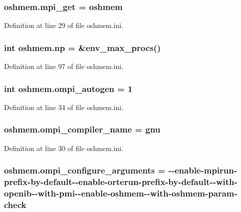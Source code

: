 \hypertarget{namespaceoshmem_a4426807cb10649f44b732f4360d67069}{
\subsubsection[{mpi\-\_\-get}]{\setlength{\rightskip}{0pt plus 5cm}oshmem.\-mpi\-\_\-get = oshmem}}\label{namespaceoshmem_a4426807cb10649f44b732f4360d67069}


Definition at line 29 of file oshmem.\-ini.

\hypertarget{namespaceoshmem_a26fdec706a8cb58b216928c30a41db44}{
\subsubsection[{np}]{\setlength{\rightskip}{0pt plus 5cm}int oshmem.\-np = \&env\-\_\-max\-\_\-procs()}}\label{namespaceoshmem_a26fdec706a8cb58b216928c30a41db44}


Definition at line 97 of file oshmem.\-ini.

\hypertarget{namespaceoshmem_a44a772104c935ce09c4ddfd8a449cad3}{
\subsubsection[{ompi\-\_\-autogen}]{\setlength{\rightskip}{0pt plus 5cm}int oshmem.\-ompi\-\_\-autogen = 1}}\label{namespaceoshmem_a44a772104c935ce09c4ddfd8a449cad3}


Definition at line 34 of file oshmem.\-ini.

\hypertarget{namespaceoshmem_a1ba136fa8004e20e4cebfc4fc401869f}{
\subsubsection[{ompi\-\_\-compiler\-\_\-name}]{\setlength{\rightskip}{0pt plus 5cm}oshmem.\-ompi\-\_\-compiler\-\_\-name = gnu}}\label{namespaceoshmem_a1ba136fa8004e20e4cebfc4fc401869f}


Definition at line 30 of file oshmem.\-ini.

\hypertarget{namespaceoshmem_a475fb23b33601f8274529d037c5f5ccc}{
\subsubsection[{ompi\-\_\-configure\-\_\-arguments}]{\setlength{\rightskip}{0pt plus 5cm}oshmem.\-ompi\-\_\-configure\-\_\-arguments = -\/-\/enable-\/mpirun-\/prefix-\/by-\/default-\/-\/enable-\/orterun-\/prefix-\/by-\/default-\/-\/with-\/openib-\/-\/with-\/pmi-\/-\/enable-\/oshmem-\/-\/with-\/oshmem-\/param-\/check}}\label{namespaceoshmem_a475fb23b33601f8274529d037c5f5ccc}


